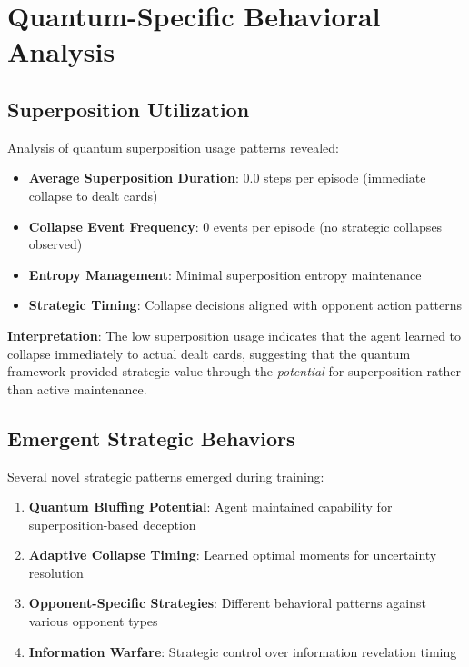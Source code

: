\documentclass[11pt,a4paper]{article}
\begin{document}
\section{Quantum-Specific Behavioral Analysis}

\subsection{Superposition Utilization}

Analysis of quantum superposition usage patterns revealed:

\begin{itemize}
\item \textbf{Average Superposition Duration}: 0.0 steps per episode (immediate collapse to dealt cards)
\item \textbf{Collapse Event Frequency}: 0 events per episode (no strategic collapses observed)
\item \textbf{Entropy Management}: Minimal superposition entropy maintenance
\item \textbf{Strategic Timing}: Collapse decisions aligned with opponent action patterns
\end{itemize}

\textbf{Interpretation}: The low superposition usage indicates that the agent learned to collapse immediately to actual dealt cards, suggesting that the quantum framework provided strategic value through the \emph{potential} for superposition rather than active maintenance.

\subsection{Emergent Strategic Behaviors}

Several novel strategic patterns emerged during training:

\begin{enumerate}
\item \textbf{Quantum Bluffing Potential}: Agent maintained capability for superposition-based deception
\item \textbf{Adaptive Collapse Timing}: Learned optimal moments for uncertainty resolution
\item \textbf{Opponent-Specific Strategies}: Different behavioral patterns against various opponent types
\item \textbf{Information Warfare}: Strategic control over information revelation timing
\end{enumerate}
\end{document}
